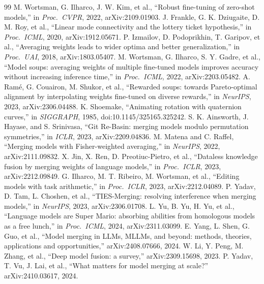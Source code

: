 \documentclass[conference]{IEEEtran}
\begin{document}
\begin{thebibliography}{99}
 M. Wortsman, G. Ilharco, J. W. Kim, et al., ``Robust fine-tuning of zero-shot models,'' in \emph{Proc.\ CVPR}, 2022, arXiv:2109.01903.
 J. Frankle, G. K. Dziugaite, D. M. Roy, et al., ``Linear mode connectivity and the lottery ticket hypothesis,'' in \emph{Proc.\ ICML}, 2020, arXiv:1912.05671.
 P. Izmailov, D. Podoprikhin, T. Garipov, et al., ``Averaging weights leads to wider optima and better generalization,'' in \emph{Proc.\ UAI}, 2018, arXiv:1803.05407.
 M. Wortsman, G. Ilharco, S. Y. Gadre, et al., ``Model soups: averaging weights of multiple fine-tuned models improves accuracy without increasing inference time,'' in \emph{Proc.\ ICML}, 2022, arXiv:2203.05482.
 A. Ram\'e, G. Couairon, M. Shukor, et al., ``Rewarded soups: towards Pareto-optimal alignment by interpolating weights fine-tuned on diverse rewards,'' in \emph{NeurIPS}, 2023, arXiv:2306.04488.
 K. Shoemake, ``Animating rotation with quaternion curves,'' in \emph{SIGGRAPH}, 1985, doi:10.1145/325165.325242.
 S. K. Ainsworth, J. Hayase, and S. Srinivasa, ``Git Re-Basin: merging models modulo permutation symmetries,'' in \emph{ICLR}, 2023, arXiv:2209.04836.
 M. Matena and C. Raffel, ``Merging models with Fisher-weighted averaging,'' in \emph{NeurIPS}, 2022, arXiv:2111.09832.
 X. Jin, X. Ren, D. Preotiuc-Pietro, et al., ``Dataless knowledge fusion by merging weights of language models,'' in \emph{Proc.\ ICLR}, 2023, arXiv:2212.09849.
 G. Ilharco, M. T. Ribeiro, M. Wortsman, et al., ``Editing models with task arithmetic,'' in \emph{Proc.\ ICLR}, 2023, arXiv:2212.04089.
 P. Yadav, D. Tam, L. Choshen, et al., ``TIES-Merging: resolving interference when merging models,'' in \emph{NeurIPS}, 2023, arXiv:2306.01708.
 L. Yu, B. Yu, H. Yu, et al., ``Language models are Super Mario: absorbing abilities from homologous models as a free lunch,'' in \emph{Proc.\ ICML}, 2024, arXiv:2311.03099.
 E. Yang, L. Shen, G. Guo, et al., ``Model merging in LLMs, MLLMs, and beyond: methods, theories, applications and opportunities,'' arXiv:2408.07666, 2024.
 W. Li, Y. Peng, M. Zhang, et al., ``Deep model fusion: a survey,'' arXiv:2309.15698, 2023.
 P. Yadav, T. Vu, J. Lai, et al., ``What matters for model merging at scale?'' arXiv:2410.03617, 2024.

\end{thebibliography}
\end{document}
